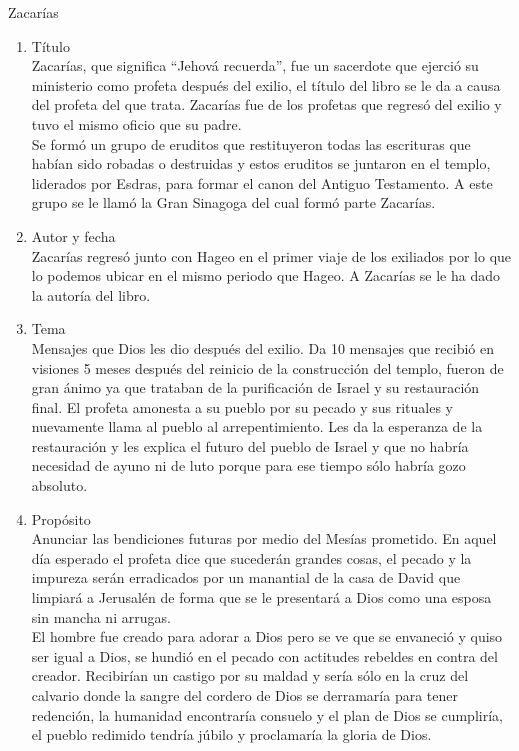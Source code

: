 %
%
\begin{section}{Zacarías}
	\begin{enumerate}
		\item Título\\
			Zacarías, que significa ``Jehová recuerda'',  fue un sacerdote que ejerció su ministerio como profeta después del exilio, el título del libro se le da a causa del profeta del que trata. Zacarías fue de los profetas que regresó del exilio y tuvo el mismo oficio que su padre.\\
			Se formó un grupo de eruditos que restituyeron todas las escrituras que habían sido robadas o destruidas y estos eruditos se juntaron en el templo, liderados por Esdras, para formar el canon del Antiguo Testamento. A este grupo se le llamó la Gran Sinagoga del cual formó parte Zacarías.
		\item Autor y fecha\\
			Zacarías regresó junto con Hageo en el primer viaje de los exiliados por lo que lo podemos ubicar en el mismo periodo que Hageo. A Zacarías se le ha dado la autoría del libro.
		\item Tema\\
			Mensajes que Dios les dio después del exilio. Da 10 mensajes que recibió en visiones 5 meses después del reinicio de la construcción del templo, fueron de gran ánimo ya que trataban de la purificación de Israel y su restauración final. El profeta amonesta a su pueblo por su pecado y sus rituales y nuevamente llama al pueblo al arrepentimiento. Les da la esperanza de la restauración y les explica el futuro del pueblo de Israel y que no habría necesidad de ayuno ni de luto porque para ese tiempo sólo habría gozo absoluto. 
		\item Propósito\\
			Anunciar las bendiciones futuras por medio del Mesías prometido. En aquel día esperado el profeta dice que sucederán grandes cosas, el pecado y la impureza serán erradicados por un manantial de la casa de David que limpiará a Jerusalén de forma que se le presentará a Dios como una esposa sin mancha ni arrugas.\\
			El hombre fue creado para adorar a Dios pero se ve que se envaneció y quiso ser igual a Dios, se hundió en el pecado con actitudes rebeldes en contra del creador. Recibirían un castigo por su maldad y sería sólo en la cruz del calvario donde la sangre del cordero de Dios se derramaría para tener redención, la humanidad encontraría consuelo y el plan de Dios se cumpliría, el pueblo redimido tendría júbilo y proclamaría la gloria de Dios.

\end{enumerate}
\end{section}

